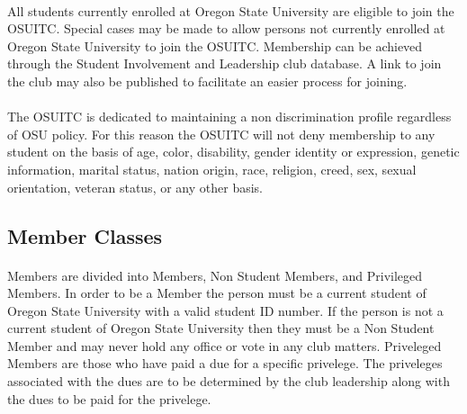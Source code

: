 \documentclass[12pt]{article}
\begin{document}
\paragraph{}
All students currently enrolled at Oregon State University are eligible to join the OSUITC. Special cases may be made to allow persons not currently enrolled at Oregon State University to join the OSUITC. Membership can be achieved through the Student Involvement and Leadership club database. A link to join the club may also be published to facilitate an easier process for joining.

\paragraph{}
The OSUITC is dedicated to maintaining a non discrimination profile regardless of OSU policy. For this reason the OSUITC will not deny membership to any student on the basis of age, color, disability, gender identity or expression, genetic information, marital status, nation origin, race, religion, creed,  sex, sexual orientation, veteran status, or any other basis. 

\subsection{Member Classes}
\paragraph{}
Members are divided into Members, Non Student Members, and Privileged Members. In order to be a Member the person must be a current student of Oregon State University with a valid student ID number.
If the person is not a current student of Oregon State University then they must be a Non Student Member and may never hold any office or vote in any club matters.
Priveleged Members are those who have paid a due for a specific privelege. The priveleges associated with the dues are to be determined by the club leadership along with the dues to be paid for the privelege.

\end{document}
